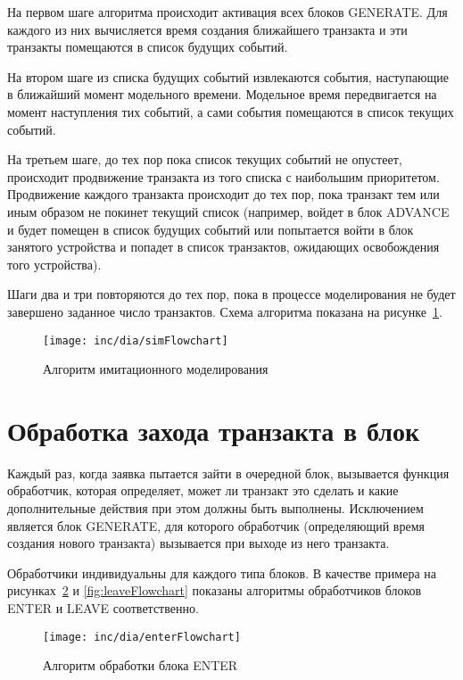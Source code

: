 На первом шаге алгоритма происходит активация всех блоков GENERATE. Для каждого из них вычисляется время создания ближайшего транзакта и эти транзакты помещаются в список будущих событий.

На втором шаге из списка будущих событий извлекаются события, наступающие в ближайший момент модельного времени. Модельное время передвигается на момент наступления тих событий, а сами события помещаются в  список текущих событий. 

На третьем шаге, до тех пор пока список текущих событий не опустеет, происходит продвижение транзакта из того списка с наибольшим приоритетом. Продвижение каждого транзакта происходит до тех пор, пока транзакт тем или иным образом не покинет текущий список (например, войдет в блок ADVANCE и будет помещен в список будущих событий или попытается войти в блок занятого устройства и попадет в список транзактов, ожидающих освобождения того устройства).

Шаги два и три повторяются до тех пор, пока в процессе моделирования не будет завершено заданное число транзактов. Схема алгоритма показана на рисунке~\ref{fig:simFlowchart}.

\begin{figure}[ht]
  \centering
  \texttt{[image: inc/dia/simFlowchart]}
  \caption{Алгоритм имитационного моделирования}
  \label{fig:simFlowchart}
\end{figure}


\section{Обработка захода транзакта в блок}

Каждый раз, когда заявка пытается зайти в очередной блок, вызывается функция обработчик, которая определяет, может ли транзакт это сделать и какие дополнительные действия при этом должны быть выполнены. Исключением является блок GENERATE, для которого обработчик (определяющий время создания нового транзакта) вызывается при выходе из него транзакта. 

Обработчики индивидуальны для каждого типа блоков. В качестве примера на рисунках~\ref{fig:enterFlowchart} и \ref{fig:leaveFlowchart} показаны алгоритмы обработчиков блоков ENTER и LEAVE соответственно.

\begin{figure}[ht]
  \centering
  \texttt{[image: inc/dia/enterFlowchart]}
  \caption{Алгоритм обработки блока ENTER}
  \label{fig:enterFlowchart}
\end{figure}

